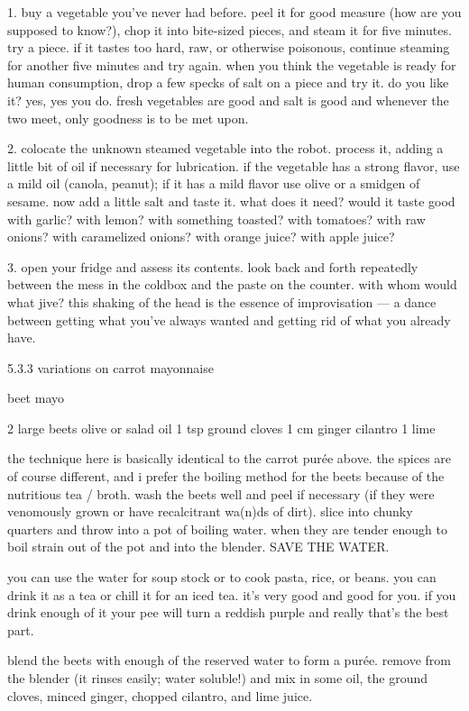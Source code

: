 1. buy a vegetable you've never had before. peel it for good measure (how are you supposed to know?), chop it into bite-sized pieces, and steam it for five minutes. try a piece. if it tastes too hard, raw, or otherwise poisonous, continue steaming for another five minutes and try again. when you think the vegetable is ready for human consumption, drop a few specks of salt on a piece and try it. do you like it? yes, yes you do. fresh vegetables are good and salt is good and whenever the two meet, only goodness is to be met upon.

2. colocate the unknown steamed vegetable into the robot. process it, adding a little bit of oil if necessary for lubrication. if the vegetable has a strong flavor, use a mild oil (canola, peanut); if it has a mild flavor use olive  or a smidgen of sesame. now add a little salt and taste it. what does it need? would it taste good with garlic? with lemon? with something toasted? with tomatoes? with raw onions? with caramelized onions? with orange juice? with apple juice?

3. open your fridge and assess its contents. look back and forth repeatedly between the mess in the coldbox and the paste on the counter. with whom would what jive? this shaking of the head is the essence of improvisation --- a dance between getting what you've always wanted and getting rid of what you already have.


5.3.3  variations on carrot mayonnaise

beet mayo

2 large beets
olive or salad oil
1 tsp ground cloves
1 cm ginger
cilantro
1 lime

the technique here is basically identical to the carrot pur\'{e}e above. the spices are of course different, and i prefer the boiling method for the beets because of the nutritious tea / broth.
wash the beets well and peel if necessary (if they were venomously grown or have recalcitrant wa(n)ds of dirt). slice into chunky quarters and throw into a pot of boiling water. when they are tender enough to boil strain out of the pot and into the blender. SAVE THE WATER.

you can use the water for soup stock or to cook pasta, rice, or beans. you can drink it as a tea or chill it for an iced tea. it's very good and good for you. if you drink enough of it your pee will turn a reddish purple and really that's the best part.

blend the beets with enough of the reserved water to form a pur\'{e}e. remove from the blender (it rinses easily; water soluble!) and mix in some oil, the ground cloves, minced ginger, chopped cilantro, and lime juice.

